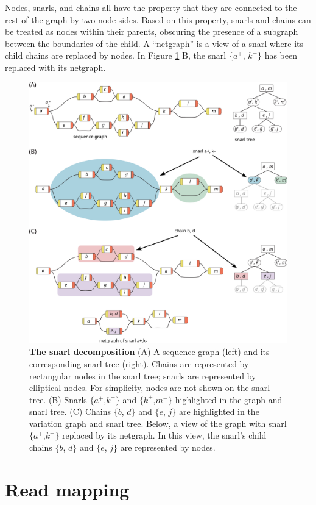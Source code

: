 \documentclass[11pt]{ucscthesis}
\begin{document}
Nodes, snarls, and chains all have the property that they are connected to the rest of the graph by two node sides.
Based on this property, snarls and chains can be treated as nodes within their parents, obscuring the presence of a subgraph between the boundaries of the child.
A ``netgraph'' is a view of a snarl where its child chains are replaced by nodes.
In Figure \ref{fig:snarl_tree} B, the snarl $\{a^+$, $k^-\}$ has been replaced with its netgraph.

\begin{figure}[htp]
    \centering
    \includegraphics[width=0.9\columnwidth]{snarl_tree.pdf}
    \caption[The snarl decomposition]{\textbf{The snarl decomposition} (A) A sequence graph (left) and its corresponding snarl tree (right). Chains are represented by rectangular nodes in the snarl tree; snarls are represented by elliptical nodes. For simplicity, nodes are not shown on the snarl tree.
    (B) Snarls $\{a^+$,$k^-\}$ and $\{k^+$,$m^-\}$ highlighted in the graph and snarl tree. (C) Chains $\{b$, $d\}$ and $\{e$, $j\}$ are highlighted in the variation graph and snarl tree. Below, a view of the graph with snarl $\{a^+$,$k^-\}$ replaced by its netgraph. In this view, the snarl's child chains $\{b$, $d\}$ and $\{e$, $j\}$ are represented by nodes.}
    \label{fig:snarl_tree}
\end{figure}

\section{Read mapping}
\label{sec:background:mapping}
\end{document}
